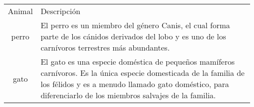 \documentclass{article}
\begin{document}
\begin{tabular}{cl}
  Animal & Descripción \\
  perro  & El perro es un miembro del género Canis, el cual forma parte 
           de los cánidos derivados del lobo y es uno de los carnívoros terrestres 
		   más abundantes. \\
  gato   & El gato es una especie doméstica de pequeños mamíferos carnívoros. Es la 
           única especie domesticada de la familia de los félidos y es a menudo llamado 
		   gato doméstico, para diferenciarlo de los miembros salvajes de la 
		   familia. \\
\end{tabular}
\end{document}
